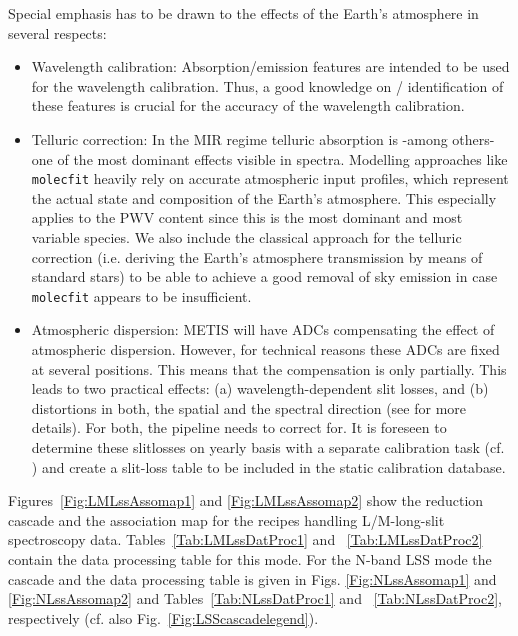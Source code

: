 Special emphasis has to be drawn to the effects of the Earth's atmosphere in several respects:
\begin{itemize}
\item Wavelength calibration: Absorption/emission features are intended to be
  used for the wavelength calibration. Thus, a good knowledge on /
  identification of these features is crucial for the accuracy of the
  wavelength calibration.
\item Telluric correction: In the MIR regime telluric absorption is -among others- one of the most dominant effects visible in    
 spectra. Modelling approaches like \texttt{molecfit} heavily rely on accurate atmospheric input profiles, which represent the actual state and composition of the Earth's atmosphere. This especially applies to the \ac{PWV} content since this is the most dominant and most variable species. We also include the classical approach for the telluric correction (i.e. deriving the Earth's atmosphere transmission by means of standard stars) to be able to achieve a good removal of sky emission in case \texttt{molecfit} appears to be insufficient.
\item Atmospheric dispersion: \ac{METIS} will have \ac{ADC}s compensating the
  effect of atmospheric dispersion. However, for technical reasons
  these ADCs are fixed at several positions. This means that the
  compensation is only partially. This leads to two practical effects:
  (a) wavelength-dependent slit losses, and (b) distortions in both,
  the spatial and the spectral direction (see \cite{METIS-ADC_study}
  for more details). For both, the pipeline needs to correct
  for. It is foreseen to determine these slitlosses on yearly basis with a separate calibration task (cf. \cite{METIS-calibration_plan}) and create a slit-loss table to be included in the static calibration database.
\end{itemize}


Figures~\ref{Fig:LMLssAssomap1} and \ref{Fig:LMLssAssomap2} show the reduction cascade and the association map for the recipes handling L/M-long-slit
spectroscopy data.  Tables~\ref{Tab:LMLssDatProc1} and ~\ref{Tab:LMLssDatProc2} contain the data processing table for this mode. For the N-band \ac{LSS} mode the cascade and the data processing table is given in Figs. \ref{Fig:NLssAssomap1} and \ref{Fig:NLssAssomap2} and Tables~\ref{Tab:NLssDatProc1} and ~\ref{Tab:NLssDatProc2}, respectively (cf. also Fig.~\ref{Fig:LSScascadelegend}).

